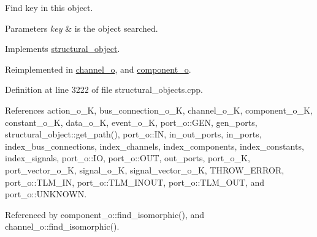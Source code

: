 Find key in this object. 


\begin{DoxyParams}{Parameters}
{\em key} & is the object searched. \\
\hline
\end{DoxyParams}


Implements \hyperlink{classstructural__object_a87756f7dab3d9a866c81b96b88e11380}{structural\+\_\+object}.



Reimplemented in \hyperlink{classchannel__o_a7565783de13f5451d94de9fda826710d}{channel\+\_\+o}, and \hyperlink{classcomponent__o_a8bb03d2af520a73c01e330f137fd9fd4}{component\+\_\+o}.



Definition at line 3222 of file structural\+\_\+objects.\+cpp.



References action\+\_\+o\+\_\+K, bus\+\_\+connection\+\_\+o\+\_\+K, channel\+\_\+o\+\_\+K, component\+\_\+o\+\_\+K, constant\+\_\+o\+\_\+K, data\+\_\+o\+\_\+K, event\+\_\+o\+\_\+K, port\+\_\+o\+::\+G\+EN, gen\+\_\+ports, structural\+\_\+object\+::get\+\_\+path(), port\+\_\+o\+::\+IN, in\+\_\+out\+\_\+ports, in\+\_\+ports, index\+\_\+bus\+\_\+connections, index\+\_\+channels, index\+\_\+components, index\+\_\+constants, index\+\_\+signals, port\+\_\+o\+::\+IO, port\+\_\+o\+::\+O\+UT, out\+\_\+ports, port\+\_\+o\+\_\+K, port\+\_\+vector\+\_\+o\+\_\+K, signal\+\_\+o\+\_\+K, signal\+\_\+vector\+\_\+o\+\_\+K, T\+H\+R\+O\+W\+\_\+\+E\+R\+R\+OR, port\+\_\+o\+::\+T\+L\+M\+\_\+\+IN, port\+\_\+o\+::\+T\+L\+M\+\_\+\+I\+N\+O\+UT, port\+\_\+o\+::\+T\+L\+M\+\_\+\+O\+UT, and port\+\_\+o\+::\+U\+N\+K\+N\+O\+WN.



Referenced by component\+\_\+o\+::find\+\_\+isomorphic(), and channel\+\_\+o\+::find\+\_\+isomorphic().

